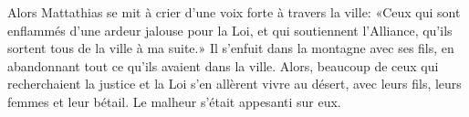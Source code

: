 Alors Mattathias se mit à crier d’une voix forte à travers la ville:
	«Ceux qui sont enflammés d’une ardeur jalouse pour la Loi,
	et qui soutiennent l’Alliance,
	qu’ils sortent tous de la ville à ma suite.»
Il s’enfuit dans la montagne avec ses fils,
	en abandonnant tout ce qu’ils avaient dans la ville.
Alors, beaucoup de ceux qui recherchaient la justice et la Loi
	s’en allèrent vivre au désert, avec leurs fils, leurs femmes et leur bétail.
Le malheur s’était appesanti sur eux.
